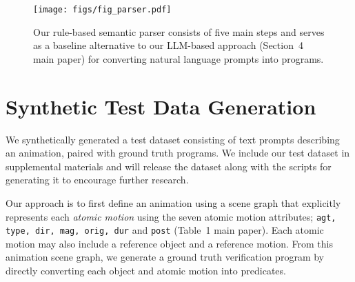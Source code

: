 \begin{figure*}[t!]
    \centering
    \texttt{[image: figs/fig\_parser.pdf]}
    \caption{
        Our rule-based semantic parser consists of five main steps and serves as a baseline alternative to our LLM-based approach (Section~4 main paper) for converting natural language prompts into \dslname{} programs. 
    }
    \label{fig:parser}
\end{figure*}

\section{Synthetic Test Data Generation}
\label{sec:prompt_generation}
%
We synthetically generated a test dataset consisting of text prompts
describing an animation, paired with ground truth \dslname{} programs.
%
We include our test dataset in supplemental materials and will release the
dataset along with the scripts for generating it to encourage further
research.

Our approach is to first define an animation using a scene graph that
explicitly represents each {\em atomic motion} using the seven atomic
motion attributes; {\tt agt, type, dir, mag, orig,
  dur} and {\tt post} (Table~1 main paper). Each atomic motion may also include a reference object and a
reference motion.  From this animation scene graph, we generate a
ground truth \dslname{} verification program by directly converting
each object and atomic motion into \dslname{} predicates.


